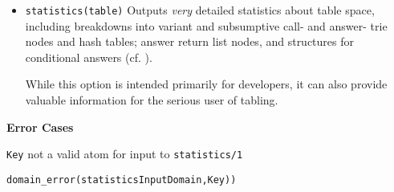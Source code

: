 \begin{description}
\begin{itemize}
\item {\tt statistics(table)} Outputs {\em very} detailed statistics
  about table space, including breakdowns into variant and subsumptive
  call- and answer- trie nodes and hash tables; answer return list
  nodes, and structures for conditional answers (cf. \cite{SaSw98,
    RRSSW98, TST99, CuSW99a}).

  While this option is intended primarily for developers, it can also
  provide valuable information for the serious user of tabling.
\end{itemize}

{\bf Error Cases}
\bi
\item {\tt Key} not a valid atom for input to {\tt statistics/1} 
\bi
\item 	{\tt domain\_error(statisticsInputDomain,Key))}
\ei
\ei


\end{description}
